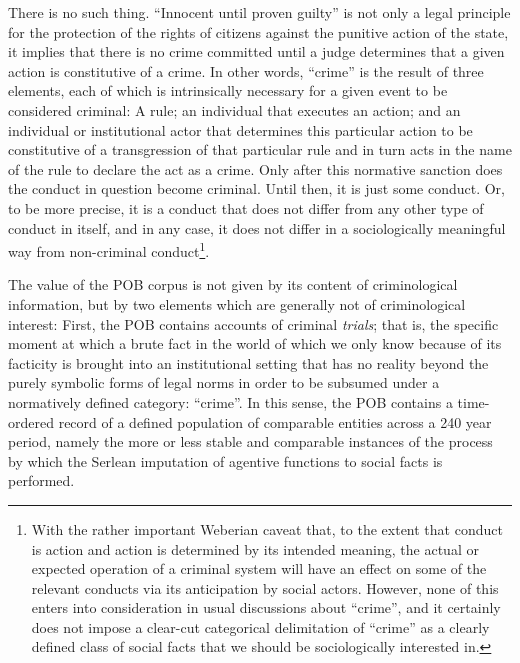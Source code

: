 There is no such thing. ``Innocent until proven guilty'' is not only a legal principle for the protection of the rights of citizens against the punitive action of the state, it implies that there is no crime committed until a judge determines that a given action is constitutive of a crime.
In other words, ``crime'' is the result of three elements, each of which is intrinsically necessary for a given event to be considered criminal:
A rule; an individual that executes an action; and an individual or institutional actor that determines this particular action to be constitutive of a transgression of that particular rule and in turn acts in the name of the rule to declare the act as a crime.
Only after this normative sanction does the conduct in question become criminal.
Until then, it is just some conduct.
Or, to be more precise, it is a conduct that does not differ from any other type of conduct in itself, and in any case, it does not differ in a sociologically meaningful way from non-criminal conduct\footnote{
    \label{foot:webercrime}
    With the rather important Weberian caveat that, to the extent that conduct is action and action is determined by its intended meaning, the actual or expected operation of a criminal system will have an effect on some of the relevant conducts via its anticipation by social actors.
    However, none of this enters into consideration in usual discussions about ``crime'', and it certainly does not impose a clear-cut categorical delimitation of ``crime'' as a clearly defined class of social facts that we should be sociologically interested in.
}.

The value of the POB corpus is not given by its content of criminological information, but by two elements which are generally not of criminological interest:
First, the POB contains accounts of criminal \emph{trials}; that is, the specific moment at which a brute fact in the world of which we only know because of its facticity is brought into an institutional setting that has no reality beyond the purely symbolic forms of legal norms in order to be subsumed under a normatively defined category: ``crime''.
In this sense, the POB contains a time-ordered record of a defined population of comparable entities across a 240 year period, namely the more or less stable and comparable instances of the process by which the Serlean imputation of agentive functions to social facts is performed.

